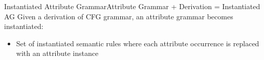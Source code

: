 






\begin{frame}{Instantiated Attribute Grammar}{Attribute Grammar + Derivation = Instantiated AG}
Given a \alert{derivation} of CFG grammar, an attribute grammar becomes \alert{instantiated}:
\begin{itemize}
    \item Set of \alert{instantiated semantic rules} where each attribute \alert{occurrence} is replaced with an \alert{attribute instance}
\end{itemize}

\end{frame}


